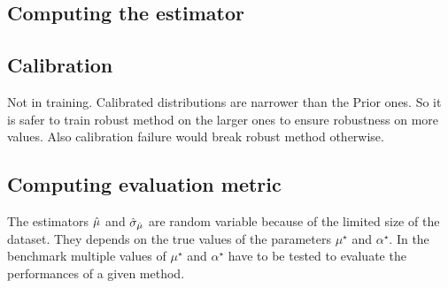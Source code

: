 \subsection{Computing the estimator} %
\label{sub:computing_the_estimator}






\subsection{Calibration} %
\label{sub:calibration}


Not in training.
Calibrated distributions are narrower than the Prior ones.
So it is safer to train robust method on the larger ones to ensure robustness on more values.
Also calibration failure would break robust method otherwise. 







\subsection{Computing evaluation metric} %
\label{sub:computing_evaluation_metric}



The estimators $\hat\mu$ and $\hat\sigma_{\hat\mu}$ are random variable because of the limited size of the dataset.
They depends on the true values of the parameters $\mu^\star$ and $\alpha^\star$.
In the benchmark multiple values of $\mu^\star$ and $\alpha^\star$ have to be tested to evaluate the performances of a given method.


















